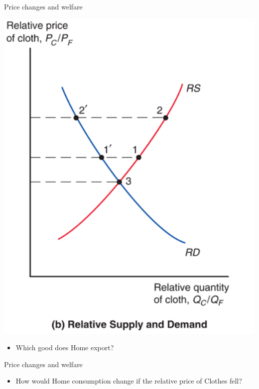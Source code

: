 \documentclass[ignorenonframetext,]{beamer}
\begin{document}
\begin{frame}{Price changes and welfare}

    \includegraphics[scale=0.25]{rs_rd.png}
    \begin{itemize}
        \item Which good does Home export?
    \end{itemize}

\end{frame}

\begin{frame}{Price changes and welfare}

    \begin{itemize}
        \item How would Home consumption change if the relative price of Clothes fell?
    \end{itemize}

\end{frame}
\end{document}
